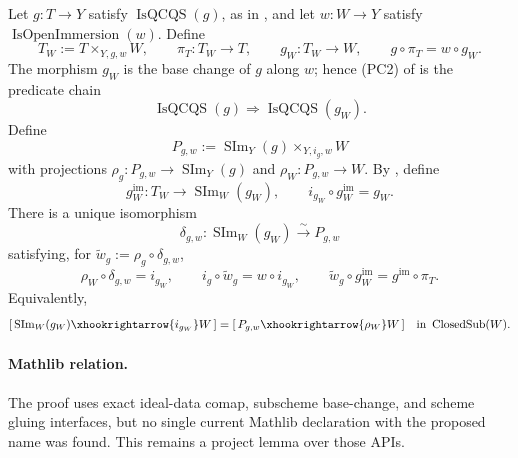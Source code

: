 \begin{lemma}
  \label{lemma:nagata-scheme-image-restrict-open}
  \lean{}

  Let \(g\colon T\to Y\) satisfy \(\operatorname{IsQCQS}(g)\), as in
  , and let
  \(w\colon W\to Y\) satisfy \(\operatorname{IsOpenImmersion}(w)\).  Define
  \[
    T_W:=T\times_{Y,g,w}W,
    \qquad
    \pi_T\colon T_W\to T,
    \qquad
    g_W\colon T_W\to W,
    \qquad
    g\circ\pi_T=w\circ g_W.
  \]
  The morphism $g_W$ is the base change of $g$ along $w$; hence (PC2) of
   is the predicate chain
  \[
    \operatorname{IsQCQS}(g)
      \Longrightarrow\operatorname{IsQCQS}(g_W).                 \tag{SIRO0}
  \]
  Define
  \[
    P_{g,w}:=\operatorname{SIm}_Y(g)\times_{Y,i_g,w}W
  \]
  with projections
  $\rho_g\colon P_{g,w}\to\operatorname{SIm}_Y(g)$ and
  $\rho_W\colon P_{g,w}\to W$.  By
  , define
  \[
    g_W^{\mathrm{im}}\colon T_W\to\operatorname{SIm}_W(g_W),
    \qquad
    i_{g_W}\circ g_W^{\mathrm{im}}=g_W.                           \tag{SIRO1}
  \]
  There is a unique isomorphism
  \[
    \delta_{g,w}\colon\operatorname{SIm}_W(g_W)
      \xrightarrow{\ \sim\ }P_{g,w}
  \]
  satisfying, for
  $\widetilde w_g:=\rho_g\circ\delta_{g,w}$,
  \[
    \rho_W\circ\delta_{g,w}=i_{g_W},
    \qquad
    i_g\circ\widetilde w_g=w\circ i_{g_W},
    \qquad
    \widetilde w_g\circ g_W^{\mathrm{im}}
      =g^{\mathrm{im}}\circ\pi_T.
  \]
  Equivalently,
  \[
    [\,\operatorname{SIm}_W(g_W)
        \xhookrightarrow{i_{g_W}}W\,]
      =[\,P_{g,w}\xhookrightarrow{\rho_W}W\,]
      \quad\text{in }\operatorname{ClosedSub}(W).
  \]

  \paragraph{Mathlib relation.}
  The proof uses exact ideal-data comap, subscheme base-change, and scheme
  gluing interfaces, but no single current Mathlib declaration with the
  proposed \texttt{} name was
  found.  This remains a project lemma over those APIs.
\end{lemma}

